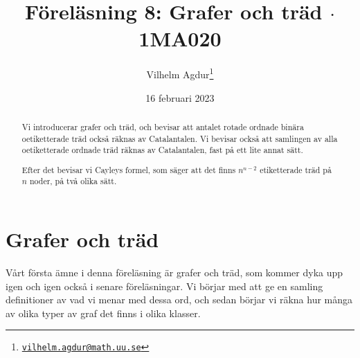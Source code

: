 \documentclass[nobib]{tufte-handout}
\title{Föreläsning 8: Grafer och träd $\cdot$ 1MA020}
\author[Vilhelm Agdur]{Vilhelm Agdur\thanks{\href{mailto:vilhelm.agdur@math.uu.se}{\nolinkurl{vilhelm.agdur@math.uu.se}}}}
\date{16 februari 2023}
\begin{document}

\maketitle%

\begin{abstract}
\noindent
Vi introducerar grafer och träd, och bevisar att antalet rotade ordnade binära oetiketterade träd också räknas av Catalantalen. Vi bevisar också att samlingen av alla oetiketterade ordnade träd räknas av Catalantalen, fast på ett lite annat sätt.

Efter det bevisar vi Cayleys formel, som säger att det finns $n^{n-2}$ etiketterade träd på $n$ noder, på två olika sätt.
\end{abstract}

\section{Grafer och träd}

Vårt första ämne i denna föreläsning är grafer och träd, som kommer dyka upp igen och igen också i senare föreläsningar. Vi börjar med att ge en samling definitioner av vad vi menar med dessa ord, och sedan börjar vi räkna hur många av olika typer av graf det finns i olika klasser.
\end{document}
